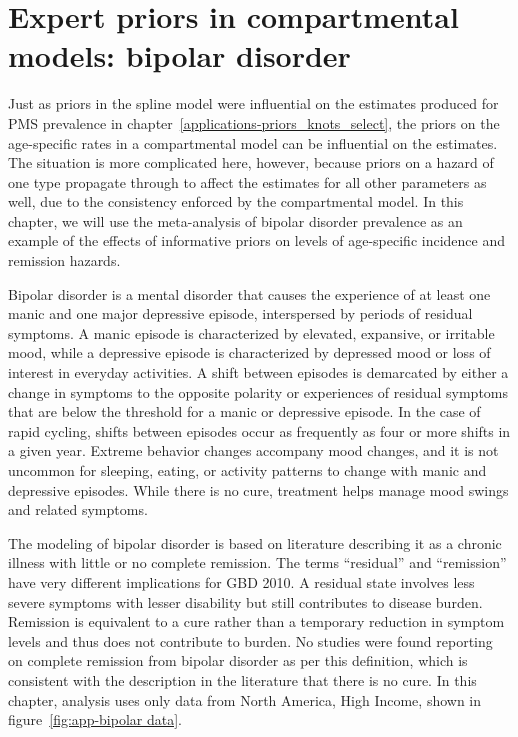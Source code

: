 \chapter{Expert priors in compartmental models: bipolar disorder}
\label{applications-prior_level_vals}

Just as priors in the spline model were influential on the estimates
produced for PMS prevalence in
chapter~\ref{applications-priors_knots_select}, the priors on the
age-specific rates in a compartmental model can be influential on the
estimates.  The situation is more complicated here, however, because
priors on a hazard of one type propagate through to affect the
estimates for all other parameters as well, due to the consistency
enforced by the compartmental model.  In this chapter, we will use the
meta-analysis of bipolar disorder prevalence as an example of the
effects of informative priors on levels of age-specific incidence and
remission hazards.

Bipolar disorder is a mental disorder that causes the experience
of at least one manic and one major depressive episode,
interspersed by periods of residual symptoms.  A manic episode is
characterized by elevated, expansive, or irritable mood, while a
depressive episode is characterized by depressed mood or loss of
interest in everyday activities.  A shift between episodes is
demarcated by either a change in symptoms to the opposite polarity
or experiences of residual symptoms that are below the threshold
for a manic or depressive episode.  In the case of rapid cycling,
shifts between episodes occur as frequently as four or more shifts
in a given year.  Extreme behavior
changes accompany mood changes, and it is not uncommon for sleeping,
eating, or activity patterns to change with manic and depressive
episodes.
While there
is no cure, treatment helps manage mood swings and related
symptoms. \cite{kloos_bipolar_2011, angst_historical_2000}

The modeling of bipolar disorder is based on literature describing it
as a chronic illness with little or no complete remission.
The terms ``residual'' and ``remission'' have very different implications
for GBD 2010.  A residual state involves less severe
symptoms with lesser disability but still contributes to disease
burden.  Remission is equivalent to a cure rather than a temporary
reduction in symptom levels and thus does not contribute to burden.  No studies
were found reporting on complete remission from bipolar disorder as per this definition,
which is consistent with the description in the literature that there
is no cure. \cite{american_psychiatric_association_diagnostic_2000}
In this chapter, analysis
uses only data from  North America, High Income,
shown in figure~\ref{fig:app-bipolar data}.

